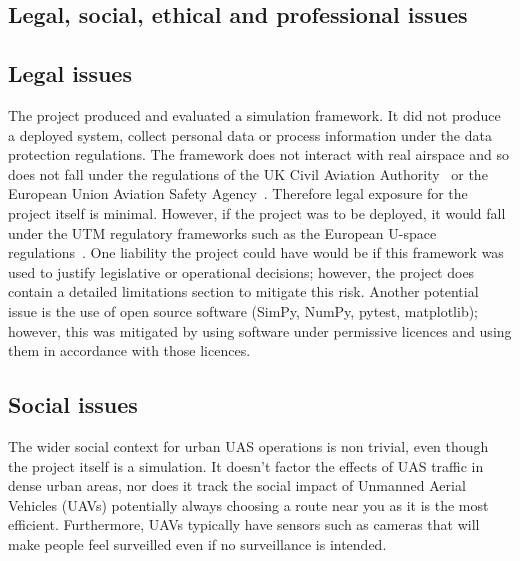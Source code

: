 \begin{appendices}
\vspace{1em}

\section{Legal, social, ethical and professional issues}

\subsection{Legal issues}

The project produced and evaluated a simulation framework. It did not produce a deployed system, collect personal data or process information under the data protection regulations. The framework does not interact with real airspace and so does not fall under the regulations of the UK Civil Aviation Authority~\citep{caa2024bvlos} or the European Union Aviation Safety Agency~\citep{easa2025anra}. Therefore legal exposure for the project itself is minimal. However, if the project was to be deployed, it would fall under the UTM regulatory frameworks such as the European U-space regulations~\cite{easa2025anra}. One liability the project could have would be if this framework was used to justify legislative or operational decisions; however, the project does contain a detailed limitations section to mitigate this risk. 
Another potential issue is the use of open source software (SimPy, NumPy, pytest, matplotlib); however, this was mitigated by using software under permissive licences and using them in accordance with those licences.\par

\vspace{1em}

\subsection{Social issues}

The wider social context for urban UAS operations is non trivial, even though the project itself is a simulation. It doesn't factor the effects of UAS traffic in dense urban areas, nor does it track the social impact of Unmanned Aerial Vehicles (UAVs) potentially always choosing a route near you as it is the most efficient. Furthermore, UAVs typically have sensors such as cameras that will make people feel surveilled even if no surveillance is intended.  \par

\vspace{1em}


\end{appendices}
